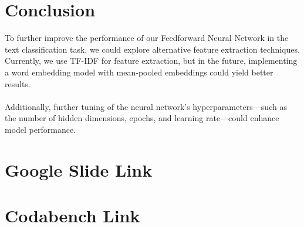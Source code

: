 \documentclass{article}
\begin{document}
\section*{Conclusion}
 
To further improve the performance of our Feedforward Neural Network in the text classification task, we could explore alternative feature extraction techniques. Currently, we use TF-IDF for feature extraction, but in the future, implementing a word embedding model with mean-pooled embeddings could yield better results. \\ \\
\noindent
Additionally, further tuning of the neural network's hyperparameters—such as the number of hidden dimensions, epochs, and learning rate—could enhance model performance.

\section*{Google Slide Link}

\section*{Codabench Link}
\end{document}

